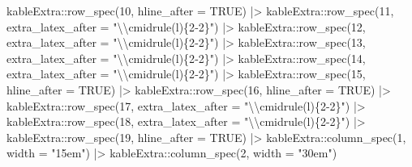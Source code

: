 \documentclass[12pt]{article}\usepackage[]{graphicx}\usepackage[]{color}
\newenvironment{Shaded}{\begin{snugshade}}{\end{snugshade}}
\newcommand{\AttributeTok}[1]{\textcolor[rgb]{0.77,0.63,0.00}{#1}}
\newcommand{\ConstantTok}[1]{\textcolor[rgb]{0.00,0.00,0.00}{#1}}
\newcommand{\DecValTok}[1]{\textcolor[rgb]{0.00,0.00,0.81}{#1}}
\newcommand{\FunctionTok}[1]{\textcolor[rgb]{0.00,0.00,0.00}{#1}}
\newcommand{\NormalTok}[1]{#1}
\newcommand{\SpecialCharTok}[1]{\textcolor[rgb]{0.00,0.00,0.00}{#1}}
\newcommand{\StringTok}[1]{\textcolor[rgb]{0.31,0.60,0.02}{#1}}
\begin{document}
\begin{Shaded}
\begin{Highlighting}[]
\NormalTok{  kableExtra}\SpecialCharTok{::}\FunctionTok{row\_spec}\NormalTok{(}\DecValTok{10}\NormalTok{, }\AttributeTok{hline\_after =} \ConstantTok{TRUE}\NormalTok{) }\SpecialCharTok{|\textgreater{}} 
\NormalTok{  kableExtra}\SpecialCharTok{::}\FunctionTok{row\_spec}\NormalTok{(}\DecValTok{11}\NormalTok{, }\AttributeTok{extra\_latex\_after =} \StringTok{"}\SpecialCharTok{\textbackslash{}\textbackslash{}}\StringTok{cmidrule(l)\{2{-}2\}"}\NormalTok{) }\SpecialCharTok{|\textgreater{}} 
\NormalTok{  kableExtra}\SpecialCharTok{::}\FunctionTok{row\_spec}\NormalTok{(}\DecValTok{12}\NormalTok{, }\AttributeTok{extra\_latex\_after =} \StringTok{"}\SpecialCharTok{\textbackslash{}\textbackslash{}}\StringTok{cmidrule(l)\{2{-}2\}"}\NormalTok{) }\SpecialCharTok{|\textgreater{}} 
\NormalTok{  kableExtra}\SpecialCharTok{::}\FunctionTok{row\_spec}\NormalTok{(}\DecValTok{13}\NormalTok{, }\AttributeTok{extra\_latex\_after =} \StringTok{"}\SpecialCharTok{\textbackslash{}\textbackslash{}}\StringTok{cmidrule(l)\{2{-}2\}"}\NormalTok{) }\SpecialCharTok{|\textgreater{}} 
\NormalTok{  kableExtra}\SpecialCharTok{::}\FunctionTok{row\_spec}\NormalTok{(}\DecValTok{14}\NormalTok{, }\AttributeTok{extra\_latex\_after =} \StringTok{"}\SpecialCharTok{\textbackslash{}\textbackslash{}}\StringTok{cmidrule(l)\{2{-}2\}"}\NormalTok{) }\SpecialCharTok{|\textgreater{}} 
\NormalTok{  kableExtra}\SpecialCharTok{::}\FunctionTok{row\_spec}\NormalTok{(}\DecValTok{15}\NormalTok{, }\AttributeTok{hline\_after =} \ConstantTok{TRUE}\NormalTok{) }\SpecialCharTok{|\textgreater{}} 
\NormalTok{  kableExtra}\SpecialCharTok{::}\FunctionTok{row\_spec}\NormalTok{(}\DecValTok{16}\NormalTok{, }\AttributeTok{hline\_after =} \ConstantTok{TRUE}\NormalTok{) }\SpecialCharTok{|\textgreater{}} 
\NormalTok{  kableExtra}\SpecialCharTok{::}\FunctionTok{row\_spec}\NormalTok{(}\DecValTok{17}\NormalTok{, }\AttributeTok{extra\_latex\_after =} \StringTok{"}\SpecialCharTok{\textbackslash{}\textbackslash{}}\StringTok{cmidrule(l)\{2{-}2\}"}\NormalTok{) }\SpecialCharTok{|\textgreater{}} 
\NormalTok{  kableExtra}\SpecialCharTok{::}\FunctionTok{row\_spec}\NormalTok{(}\DecValTok{18}\NormalTok{, }\AttributeTok{extra\_latex\_after =} \StringTok{"}\SpecialCharTok{\textbackslash{}\textbackslash{}}\StringTok{cmidrule(l)\{2{-}2\}"}\NormalTok{) }\SpecialCharTok{|\textgreater{}} 
\NormalTok{  kableExtra}\SpecialCharTok{::}\FunctionTok{row\_spec}\NormalTok{(}\DecValTok{19}\NormalTok{, }\AttributeTok{hline\_after =} \ConstantTok{TRUE}\NormalTok{) }\SpecialCharTok{|\textgreater{}} 
\NormalTok{  kableExtra}\SpecialCharTok{::}\FunctionTok{column\_spec}\NormalTok{(}\DecValTok{1}\NormalTok{, }\AttributeTok{width =} \StringTok{"15em"}\NormalTok{) }\SpecialCharTok{|\textgreater{}}
\NormalTok{  kableExtra}\SpecialCharTok{::}\FunctionTok{column\_spec}\NormalTok{(}\DecValTok{2}\NormalTok{, }\AttributeTok{width =} \StringTok{"30em"}\NormalTok{)}
\end{Highlighting}
\end{Shaded}
\end{document}
